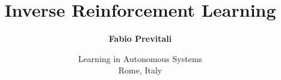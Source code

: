 \documentclass{beamer}
\title[Inverse Reinforcement Learning]{\Large Inverse Reinforcement Learning}
\subtitle{}
\author[Fabio Previtali]{\large\textbf{Fabio Previtali}}
\date[March 20, 2015]{\small Learning in Autonomous Systems\\Rome, Italy}
\begin{document}
\begin{frame}[plain]
	\titlepage
\end{frame}





\end{document}
